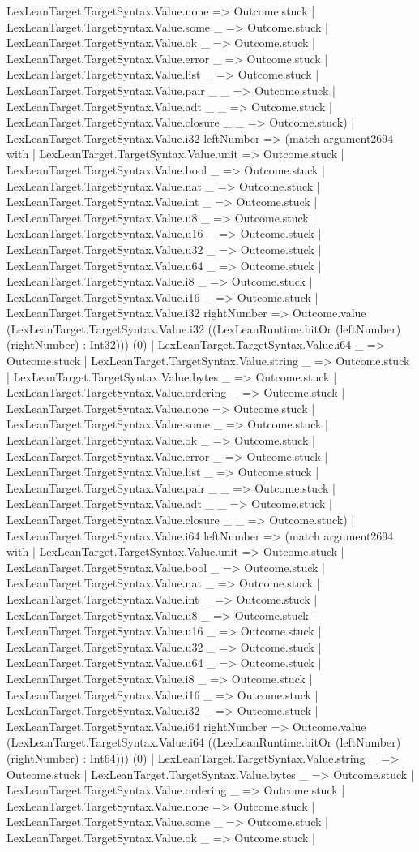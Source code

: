 \documentclass[11pt]{article}
\begin{document}
LexLeanTarget.TargetSyntax.Value.none => Outcome.stuck | LexLeanTarget.TargetSyntax.Value.some \_ => Outcome.stuck | LexLeanTarget.TargetSyntax.Value.ok \_ => Outcome.stuck | LexLeanTarget.TargetSyntax.Value.error \_ => Outcome.stuck | LexLeanTarget.TargetSyntax.Value.list \_ => Outcome.stuck | LexLeanTarget.TargetSyntax.Value.pair \_ \_ => Outcome.stuck | LexLeanTarget.TargetSyntax.Value.adt \_ \_ => Outcome.stuck | LexLeanTarget.TargetSyntax.Value.closure \_ \_ => Outcome.stuck) | LexLeanTarget.TargetSyntax.Value.i32 leftNumber => (match argument2694 with | LexLeanTarget.TargetSyntax.Value.unit => Outcome.stuck | LexLeanTarget.TargetSyntax.Value.bool \_ => Outcome.stuck | LexLeanTarget.TargetSyntax.Value.nat \_ => Outcome.stuck | LexLeanTarget.TargetSyntax.Value.int \_ => Outcome.stuck | LexLeanTarget.TargetSyntax.Value.u8 \_ => Outcome.stuck | LexLeanTarget.TargetSyntax.Value.u16 \_ => Outcome.stuck | LexLeanTarget.TargetSyntax.Value.u32 \_ => Outcome.stuck | LexLeanTarget.TargetSyntax.Value.u64 \_ => Outcome.stuck | LexLeanTarget.TargetSyntax.Value.i8 \_ => Outcome.stuck | LexLeanTarget.TargetSyntax.Value.i16 \_ => Outcome.stuck | LexLeanTarget.TargetSyntax.Value.i32 rightNumber => Outcome.value (LexLeanTarget.TargetSyntax.Value.i32 ((LexLeanRuntime.bitOr (leftNumber) (rightNumber) : Int32))) (0) | LexLeanTarget.TargetSyntax.Value.i64 \_ => Outcome.stuck | LexLeanTarget.TargetSyntax.Value.string \_ => Outcome.stuck | LexLeanTarget.TargetSyntax.Value.bytes \_ => Outcome.stuck | LexLeanTarget.TargetSyntax.Value.ordering \_ => Outcome.stuck | LexLeanTarget.TargetSyntax.Value.none => Outcome.stuck | LexLeanTarget.TargetSyntax.Value.some \_ => Outcome.stuck | LexLeanTarget.TargetSyntax.Value.ok \_ => Outcome.stuck | LexLeanTarget.TargetSyntax.Value.error \_ => Outcome.stuck | LexLeanTarget.TargetSyntax.Value.list \_ => Outcome.stuck | LexLeanTarget.TargetSyntax.Value.pair \_ \_ => Outcome.stuck | LexLeanTarget.TargetSyntax.Value.adt \_ \_ => Outcome.stuck | LexLeanTarget.TargetSyntax.Value.closure \_ \_ => Outcome.stuck) | LexLeanTarget.TargetSyntax.Value.i64 leftNumber => (match argument2694 with | LexLeanTarget.TargetSyntax.Value.unit => Outcome.stuck | LexLeanTarget.TargetSyntax.Value.bool \_ => Outcome.stuck | LexLeanTarget.TargetSyntax.Value.nat \_ => Outcome.stuck | LexLeanTarget.TargetSyntax.Value.int \_ => Outcome.stuck | LexLeanTarget.TargetSyntax.Value.u8 \_ => Outcome.stuck | LexLeanTarget.TargetSyntax.Value.u16 \_ => Outcome.stuck | LexLeanTarget.TargetSyntax.Value.u32 \_ => Outcome.stuck | LexLeanTarget.TargetSyntax.Value.u64 \_ => Outcome.stuck | LexLeanTarget.TargetSyntax.Value.i8 \_ => Outcome.stuck | LexLeanTarget.TargetSyntax.Value.i16 \_ => Outcome.stuck | LexLeanTarget.TargetSyntax.Value.i32 \_ => Outcome.stuck | LexLeanTarget.TargetSyntax.Value.i64 rightNumber => Outcome.value (LexLeanTarget.TargetSyntax.Value.i64 ((LexLeanRuntime.bitOr (leftNumber) (rightNumber) : Int64))) (0) | LexLeanTarget.TargetSyntax.Value.string \_ => Outcome.stuck | LexLeanTarget.TargetSyntax.Value.bytes \_ => Outcome.stuck | LexLeanTarget.TargetSyntax.Value.ordering \_ => Outcome.stuck | LexLeanTarget.TargetSyntax.Value.none => Outcome.stuck | LexLeanTarget.TargetSyntax.Value.some \_ => Outcome.stuck | LexLeanTarget.TargetSyntax.Value.ok \_ => Outcome.stuck | 
\end{document}
